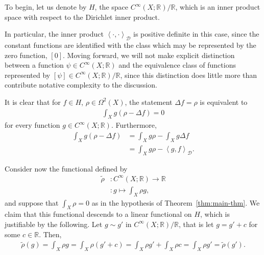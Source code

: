To begin, let us denote by $ H $, the space $ C
		^{\infty}(X;\mathbb{R})/\mathbb{R} $, which is an inner product space with
respect to the Dirichlet inner product.

\begin{remark}
	In particular, the inner product $ \left\langle \cdot , \cdot  \right\rangle
		_{\mathcal{D}} $ is positive definite in this case, since the constant functions
	are identified with the class which may be represented by the zero function, $
		\left[ 0 \right] $. Moving forward, we will not make explicit distinction
	between a function $ \psi \in C ^{\infty}(X;\mathbb{R}) $ and the equivalence
	class of functions represented by $ \left[ \psi \right] \in C
			^{\infty}(X;\mathbb{R})/\mathbb{R} $, since this distinction does little
	more than contribute notative complexity to the discussion.
\end{remark}

It is clear that for $ f \in H $, $ \rho \in
	\Omega^2(X) $, the statement $ \Delta f = \rho $ is equivalent to
\begin{align*}
	\int_{X}{g \left( \rho - \Delta f \right)}=0
\end{align*}
for every function $ g \in C ^{\infty}(X ;\mathbb{R}) $. Furthermore,
\begin{align*}
	\int_{X}{g \left( \rho - \Delta f \right)} & = \int_{X}{g \rho} - \int_{X}{g
	\Delta f}                                                                      \\
	                                           & = \int_{X}{g \rho} - \left\langle
	g,f\right\rangle _{\mathcal{D}}.
\end{align*}

Consider now the functional defined by
\begin{align*}
	\tilde{\rho} & : C ^{\infty}(X; \mathbb{R}) \to \mathbb{R} \\
	             & : g \mapsto \int_{X}{\rho g},
\end{align*}
and suppose that $ \int_{X}{\rho} = 0 $ as in the hypothesis of
Theorem~\ref{thm:main-thm}. We claim that this functional descends to a linear
functional on $ H $, which is justifiable by the following. Let $ g \sim g' $ in
$ C ^{\infty}(X;\mathbb{R})/\mathbb{R} $, that is let $ g = g' + c $ for some $
	c \in \mathbb{R}$. Then,
\begin{align*}
	\tilde{\rho}(g) = \int_{X}{\rho g}
	= \int_{X}{\rho \left( g' + c \right)}
	= \int_{X}{\rho g'} + \int_{X}{\rho c}
	= \int_{X}{\rho g'}
	= \tilde{\rho} (g').
\end{align*}

